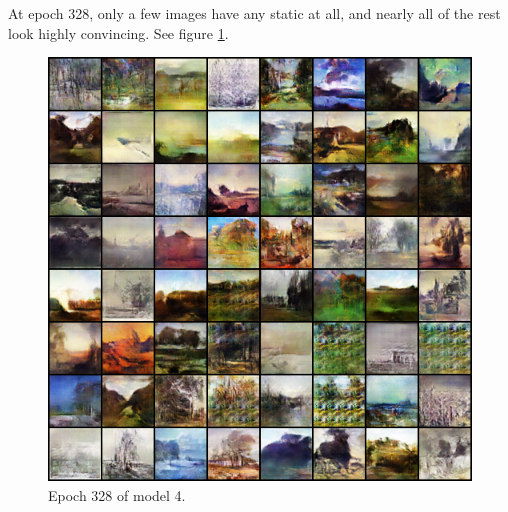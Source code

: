 \documentclass[11pt,letterpaper]{article}
\begin{document}
				At epoch 328, only a few images have any static at all, and nearly all of the rest look highly convincing.
				See figure \ref{fig:wa64:epoch328generator}.
				\begin{figure}
					\centering
					\includegraphics[width=1.0\linewidth]{results/model4/epoch328_generator}
					\caption{Epoch 328 of model 4.}
					\label{fig:wa64:epoch328generator}
				\end{figure}
\end{document}
